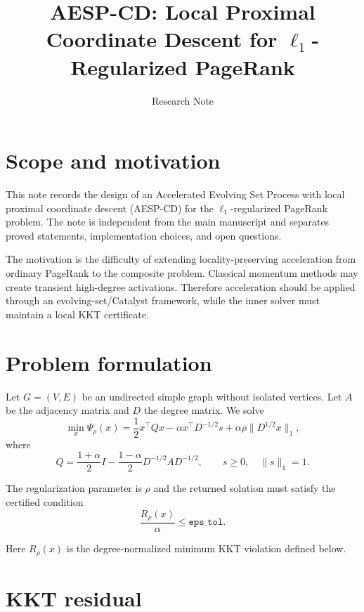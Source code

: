 \documentclass[11pt]{article}
\title{AESP-CD: Local Proximal Coordinate Descent for $\ell_1$-Regularized PageRank}
\author{Research Note}
\date{}
\begin{document}
\maketitle

\section{Scope and motivation}

This note records the design of an Accelerated Evolving Set Process with local proximal coordinate descent (AESP-CD) for the $\ell_1$-regularized PageRank problem. The note is independent from the main manuscript and separates proved statements, implementation choices, and open questions.

The motivation is the difficulty of extending locality-preserving acceleration from ordinary PageRank to the composite problem. Classical momentum methods may create transient high-degree activations. Therefore acceleration should be applied through an evolving-set/Catalyst framework, while the inner solver must maintain a local KKT certificate.

\section{Problem formulation}

Let $G=(V,E)$ be an undirected simple graph without isolated vertices. Let $A$ be the adjacency matrix and $D$ the degree matrix. We solve
\begin{equation}
\min_x \Psi_\rho(x)=\frac12x^\top Qx-\alpha x^\top D^{-1/2}s+\alpha\rho\|D^{1/2}x\|_1,
\end{equation}
where
\begin{equation}
Q=\frac{1+\alpha}{2}I-\frac{1-\alpha}{2}D^{-1/2}AD^{-1/2},
\qquad s\geq0,\quad \|s\|_1=1.
\end{equation}

The regularization parameter is $\rho$ and the returned solution must satisfy the certified condition
\begin{equation}
\frac{R_\rho(x)}{\alpha}\leq \texttt{eps\_tol}.
\end{equation}

Here $R_\rho(x)$ is the degree-normalized minimum KKT violation defined below.

\section{KKT residual}
\end{document}
